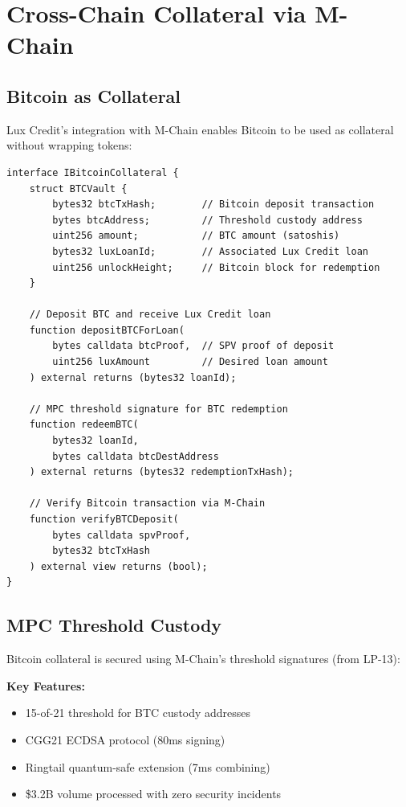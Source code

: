 \documentclass[11pt,a4paper]{article}
\begin{document}
\section{Cross-Chain Collateral via M-Chain}

\subsection{Bitcoin as Collateral}

Lux Credit's integration with M-Chain enables Bitcoin to be used as collateral without wrapping tokens:

\begin{lstlisting}[language=Solidity, basicstyle=\small\ttfamily]
interface IBitcoinCollateral {
    struct BTCVault {
        bytes32 btcTxHash;        // Bitcoin deposit transaction
        bytes btcAddress;         // Threshold custody address
        uint256 amount;           // BTC amount (satoshis)
        bytes32 luxLoanId;        // Associated Lux Credit loan
        uint256 unlockHeight;     // Bitcoin block for redemption
    }
    
    // Deposit BTC and receive Lux Credit loan
    function depositBTCForLoan(
        bytes calldata btcProof,  // SPV proof of deposit
        uint256 luxAmount         // Desired loan amount
    ) external returns (bytes32 loanId);
    
    // MPC threshold signature for BTC redemption
    function redeemBTC(
        bytes32 loanId,
        bytes calldata btcDestAddress
    ) external returns (bytes32 redemptionTxHash);
    
    // Verify Bitcoin transaction via M-Chain
    function verifyBTCDeposit(
        bytes calldata spvProof,
        bytes32 btcTxHash
    ) external view returns (bool);
}
\end{lstlisting}

\subsection{MPC Threshold Custody}

Bitcoin collateral is secured using M-Chain's threshold signatures (from LP-13):

\textbf{Key Features:}
\begin{itemize}
\item 15-of-21 threshold for BTC custody addresses
\item CGG21 ECDSA protocol (80ms signing)
\item Ringtail quantum-safe extension (7ms combining)
\item \$3.2B volume processed with zero security incidents
\end{itemize}
\end{document}

